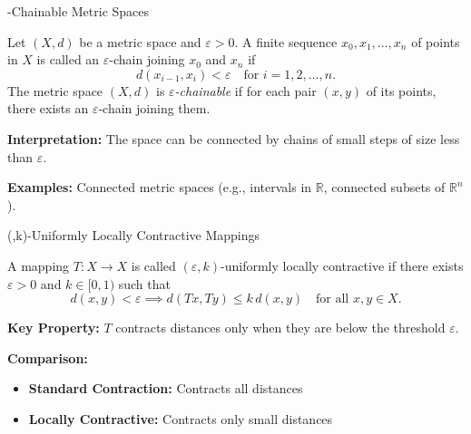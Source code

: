 \documentclass[aspectratio=169,10pt]{beamer}
\begin{document}
\begin{frame}{\varepsilon -Chainable Metric Spaces}
  \begin{definition}
    Let $(X,d)$ be a metric space and $\varepsilon > 0$. A finite sequence
    $x_0, x_1, \ldots, x_n$ of points in $X$ is called an $\varepsilon$-chain joining
    $x_0$ and $x_n$ if
    \[
      d(x_{i-1}, x_i) < \varepsilon \quad \text{for } i = 1, 2, \ldots, n.
    \]
    The metric space $(X,d)$ is \emph{$\varepsilon$-chainable} if for each pair $(x,y)$
    of its points, there exists an $\varepsilon$-chain joining them.
  \end{definition}

  \vspace{0.3cm}

  \textbf{Interpretation:} The space can be connected by chains of small steps of size less than $\varepsilon$.

  \vspace{0.3cm}

  \textbf{Examples:} Connected metric spaces (e.g., intervals in $\mathbb{R}$, connected
  subsets of $\mathbb{R}^n$).
\end{frame}

\begin{frame}{(\varepsilon ,k)-Uniformly Locally Contractive Mappings}
  \begin{definition}
    A mapping $T : X \to X$ is called $(\varepsilon, k)$-uniformly locally contractive
    if there exists $\varepsilon > 0$ and $k \in [0,1)$ such that
    \[
      d(x,y) < \varepsilon \implies d(Tx, Ty) \leq k \, d(x,y) \quad \text{for all } x,y \in X.
    \]
  \end{definition}

  \vspace{0.3cm}

  \textbf{Key Property:} $T$ contracts distances only when they are below the threshold $\varepsilon$.

  \vspace{0.3cm}

  \textbf{Comparison:}
  \begin{itemize}
    \item \textbf{Standard Contraction:} Contracts all distances
    \item \textbf{Locally Contractive:} Contracts only small distances
  \end{itemize}
\end{frame}
\end{document}
